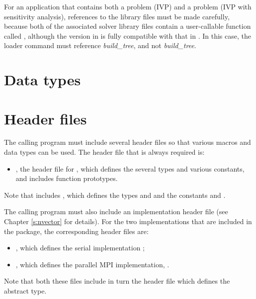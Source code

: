 For an application that contains both a {\cvode} problem (IVP) and a
{\cvodes} problem (IVP with sensitivity analysis), 
references to the library files must be made carefully, because both
of the associated solver library files contain a user-callable
function called , although the version in {\cvodes} is fully
compatible with that in {\cvode}.  In this case, the loader command
must reference {\em build\_tree}, and not 
{\em build\_tree}.

\section{Data types}\label{s:types}


\section{Header files}\label{ss:header_sim}
The calling program must include several header files so that various macros
and data types can be used. The header file that is always required is:
\begin{itemize}
\item  {}, 
  the header file for {\cvode}, which defines the several
  types and various constants, and includes function prototypes.
\end{itemize}
Note that  includes , 
which defines the types  and 
and the constants  and .

The calling program must also include an {\nvector} implementation header file
(see Chapter \ref{s:nvector} for details).
For the two {\nvector} implementations that are included in the {\cvode} package,
the corresponding header files are:
\begin{itemize}
\item {}, 
  which defines the serial implementation {\nvecs};
\item {}, 
  which defines the parallel MPI implementation, {\nvecp}.
\end{itemize}
Note that both these files include in turn the header file  which 
defines the abstract  type. 

